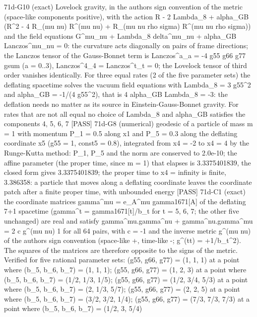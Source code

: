 \documentclass[
  10pt,
]{article}
\newenvironment{Shaded}{}{}
\newcommand{\NormalTok}[1]{#1}
\begin{document}
\begin{Shaded}
\begin{Highlighting}[]
\NormalTok{[PASS] 71d{-}G10  (exact) Lovelock gravity, in the author\textquotesingle{}s sign convention of the metric (space{-}like components positive), with the action R {-} 2 Lambda\_8 + alpha\_GB (R\^{}2 {-} 4 R\_(mu nu) R\^{}(mu nu) + R\_(mu nu rho sigma) R\^{}(mu nu rho sigma)) and the field equations G\^{}mu\_nu + Lambda\_8 delta\^{}mu\_nu + alpha\_GB Lanczos\^{}mu\_nu = 0: the curvature acts diagonally on pairs of frame directions; the Lanczos tensor of the Gauss{-}Bonnet term is Lanczos\^{}a\_a = {-}4 g55 g66 g77 gsum (a = 0..3), Lanczos\^{}4\_4 = Lanczos\^{}t\_t = 0; the Lovelock tensor of third order vanishes identically. For three equal rates (2 of the five parameter sets) the deflating spacetime solves the vacuum field equations with Lambda\_8 = 3 g55\^{}2 and alpha\_GB = {-}1/(4 g55\^{}2), that is 4 alpha\_GB Lambda\_8 = {-}3: the deflation needs no matter as its source in Einstein{-}Gauss{-}Bonnet gravity. For rates that are not all equal no choice of Lambda\_8 and alpha\_GB satisfies the components 4, 5, 6, 7}
\NormalTok{[PASS] 71d{-}G8  (numerical) geodesic of a particle of mass m = 1 with momentum P\_1 = 0.5 along x1 and P\_5 = 0.3 along the deflating coordinate x5 (g55 = 1, const5 = 0.8), integrated from x4 = {-}2 to x4 = 4 by the Runge{-}Kutta method: P\_1, P\_5 and the norm are conserved to 2.0e{-}10; the affine parameter (the proper time, since m = 1) that elapses is 3.3375401839, the closed form gives 3.3375401839; the proper time to x4 = infinity is finite, 3.386358: a particle that moves along a deflating coordinate leaves the coordinate patch after a finite proper time, with unbounded energy}
\NormalTok{[PASS] 71d{-}C1  (exact) the coordinate matrices gamma\^{}mu = e\_A\^{}mu gamma1671[A] of the deflating 7+1 spacetime (gamma\^{}t = gamma1671[t]/b\_t for t = 5, 6, 7; the other five unchanged) are real and satisfy gamma\^{}mu.gamma\^{}nu + gamma\^{}nu.gamma\^{}mu = 2 c g\^{}(mu nu) 1 for all 64 pairs, with c = {-}1 and the inverse metric g\^{}(mu nu) of the author\textquotesingle{}s sign convention (space{-}like +, time{-}like {-}; g\^{}(tt) = +1/b\_t\^{}2). The squares of the matrices are therefore opposite to the signs of the metric. Verified for five rational parameter sets: (g55, g66, g77) = (1, 1, 1) at a point where (b\_5, b\_6, b\_7) = (1, 1, 1); (g55, g66, g77) = (1, 2, 3) at a point where (b\_5, b\_6, b\_7) = (1/2, 1/3, 1/5); (g55, g66, g77) = (1/2, 3/4, 5/3) at a point where (b\_5, b\_6, b\_7) = (2, 1/3, 5/7); (g55, g66, g77) = (2, 2, 5) at a point where (b\_5, b\_6, b\_7) = (3/2, 3/2, 1/4); (g55, g66, g77) = (7/3, 7/3, 7/3) at a point where (b\_5, b\_6, b\_7) = (1/2, 3, 5/4)}

\end{Highlighting}
\end{Shaded}
\end{document}
